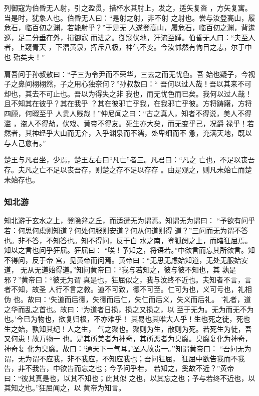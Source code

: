 \documentclass[]{article}
\begin{document}
列御寇为伯昏无人射，引之盈贯，措杯水其肘上，发之，适矢复沓
，方矢复寓。当是时，犹象人也。伯昏无人曰：``是射之射，非不射
之射也。尝与汝登高山，履危石，临百仞之渊，若能射乎？''于是无
人遂登高山，履危石，临百仞之渊，背逡巡，足二分垂在外，揖御寇
而进之。御寇伏地，汗流至踵。伯昏无人曰：``夫至人者，上窥青天
，下潜黄泉，挥斥八极，神气不变。今汝怵然有恂目之志，尔于中也 殆矣夫！''

肩吾问于孙叔敖曰：``子三为令尹而不荣华，三去之而无忧色。吾
始也疑子，今视子之鼻间栩栩然，子之用心独奈何？''孙叔敖曰：``
吾何以过人哉！吾以其来不可却也，其去不可止也。吾以为得失之非
我也，而无忧色而已矣。我何以过人哉！且不知其在彼乎？其在我乎
？其在彼邪亡乎我，在我邪亡乎彼。方将踌躇，方将四顾，何暇至乎
人贵人贱哉！''仲尼闻之曰：``古之真人，知者不得说，美人不得滥
，盗人不得劫，伏戏、黄帝不得友。死生亦大矣，而无变乎己，况爵
禄乎！若然者，其神经乎大山而无介，入乎渊泉而不濡，处卑细而不
惫，充满天地，既以与人己愈有。''

楚王与凡君坐，少焉，楚王左右曰``凡亡''者三。凡君曰：``凡之
亡也，不足以丧吾存。夫凡之亡不足以丧吾存，则楚之存不足以存存
。由是观之，则凡未始亡而楚未始存也。

\hypertarget{header-n2268}{%
\subsubsection{知北游}\label{header-n2268}}

知北游于玄水之上，登隐弅之丘，而适遭无为谓焉。知谓无为谓曰：
``予欲有问乎若：何思何虑则知道？何处何服则安道？何从何道则得
道？''三问而无为谓不答也。非不答，不知答也。知不得问，反于白
水之南，登狐阕之上，而睹狂屈焉。知以之言也问乎狂屈。狂屈曰：
``唉！予知之，将语若。''中欲言而忘其所欲言。知不得问，反于帝
宫，见黄帝而问焉。黄帝曰：``无思无虑始知道，无处无服始安道，
无从无道始得道。''知问黄帝曰：``我与若知之，彼与彼不知也，其
孰是邪？''黄帝曰：``彼无为谓
真是也，狂屈似之，我与汝终不近也。夫知者不言，言者不知，故圣
人行不言之教。道不可致，德不可至。仁可为也，义可亏也，礼相伪
也。故曰：`失道而后德，失德而后仁，失仁而后义，失义而后礼。
'礼者，道之华而乱之首也。故曰：`为道者日损，损之又损之，以
至于无为。无为而无不为也。'今已为物也，欲复归根，不亦难乎！
其易也其唯大人乎！生也死之徒，死也生之始，孰知其纪！人之生，
气之聚也。聚则为生，散则为死。若死生为徒，吾又何患！故万物一
也。是其所美者为神奇，其所恶者为臭腐。臭腐复化为神奇，神奇复
化为臭腐。故曰：`通天下一气耳。'圣人故贵一。''知谓黄帝曰：
``吾问无为谓，无为谓不应我，非不我应，不知应我也；吾问狂屈，
狂屈中欲告我而不我告，非不我告，中欲告而忘之也；今予问乎若，
若知之，奚故不近？''黄帝曰：``彼其真是也，以其不知也；此其似
之也，以其忘之也；予与若终不近也，以其知之也。''狂屈闻之，以
黄帝为知言。
\end{document}

